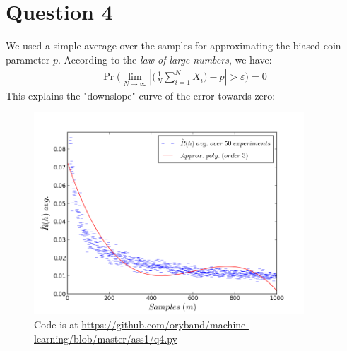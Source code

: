 \documentclass[a4paper]{article}
\renewcommand{\epsilon}{\varepsilon}
\newcommand{\Sum}{\sum\limits_{i=1}^N}
\newcommand{\qedsquare}{\tag*{$\square$}}
\begin{document}
\section {Question 4}

We used a simple average over the samples for approximating the biased coin parameter $p$.
According to the \textit{law of large numbers}, we have:
\begin{align*}
    \displaystyle \Pr \Bigg( \lim_{N \to \infty} | \Big( \frac{1}{N} \Sum X_i \Big) - p | > \epsilon \Bigg) = 0
\end{align*}
This explains the "downslope" curve of the error towards zero:

\begin{figure}[h!]
    \includegraphics[width=0.9\textwidth]{q4.png}
    \caption{Code is at \url{https://github.com/oryband/machine-learning/blob/master/ass1/q4.py}}
\end{figure}

\begin{align*}\qedsquare\end{align*}
\end{document}
